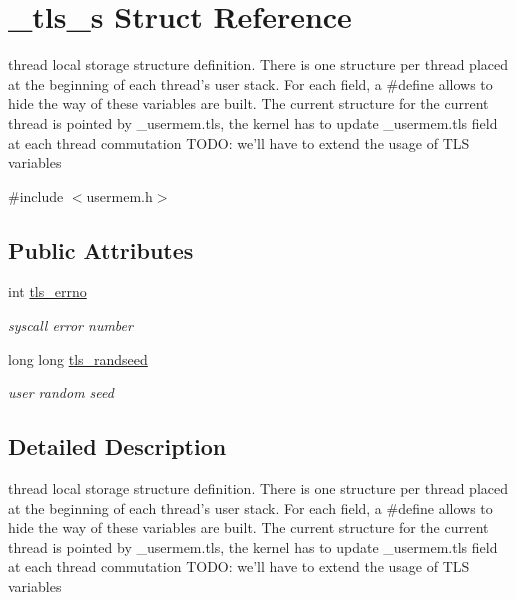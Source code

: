 \hypertarget{struct__tls__s}{\section{\-\_\-tls\-\_\-s Struct Reference}
\label{struct__tls__s}
}


thread local storage structure definition. There is one structure per thread placed at the beginning of each thread's user stack. For each field, a \#define allows to hide the way of these variables are built. The current structure for the current thread is pointed by \-\_\-usermem.\-tls, the kernel has to update \-\_\-usermem.\-tls field at each thread commutation T\-O\-D\-O\-: we'll have to extend the usage of T\-L\-S variables  




{\ttfamily \#include $<$usermem.\-h$>$}

\subsection*{Public Attributes}
\begin{DoxyCompactItemize}
\item 
int \hyperlink{struct__tls__s_a2b0505d872f110754ab80cdfe94bf58e}{tls\-\_\-errno}
\begin{DoxyCompactList}\small\item\em syscall error number \end{DoxyCompactList}\item 
long long \hyperlink{struct__tls__s_ae577aa68649d5ef9a8eec1ac1c4f3c88}{tls\-\_\-randseed}
\begin{DoxyCompactList}\small\item\em user random seed \end{DoxyCompactList}\end{DoxyCompactItemize}


\subsection{Detailed Description}
thread local storage structure definition. There is one structure per thread placed at the beginning of each thread's user stack. For each field, a \#define allows to hide the way of these variables are built. The current structure for the current thread is pointed by \-\_\-usermem.\-tls, the kernel has to update \-\_\-usermem.\-tls field at each thread commutation T\-O\-D\-O\-: we'll have to extend the usage of T\-L\-S variables 

